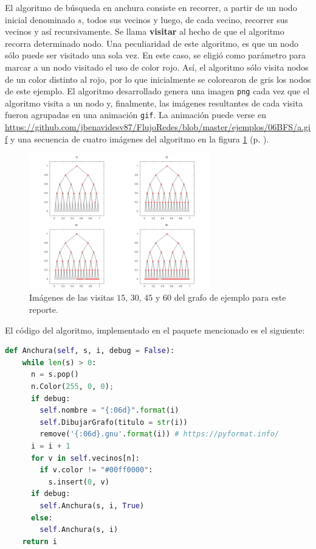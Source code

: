 \documentclass{article}
\begin{document}
  El algoritmo de búsqueda en anchura consiste en recorrer, a partir de un nodo inicial denominado $s$, todos sus vecinos y luego, de cada vecino, recorrer sus vecinos y así recursivamente. Se llama \textbf{visitar} al hecho de que el algoritmo recorra determinado nodo. Una peculiaridad de este algoritmo, es que un nodo sólo puede ser visitado una sola vez. En este caso, se eligió como parámetro para marcar a un nodo visitado el uso de color rojo. Así, el algoritmo sólo visita nodos de un color distinto al rojo, por lo que inicialmente se colorearon de gris los nodos de este ejemplo. El algoritmo desarrollado genera una imagen \texttt{png} cada vez que el algoritmo visita a un nodo y, finalmente, las imágenes resultantes de cada visita fueron agrupadas en una animación \texttt{gif}. La animación puede verse en \url{https://github.com/jbenavidesv87/FlujoRedes/blob/master/ejemplos/06BFS/a.gif} y una secuencia de cuatro imágenes del algoritmo en la figura \ref{ejemploAnchura} (p. \pageref{ejemploAnchura}).

  \begin{figure}[h]
    \includegraphics[width=0.7\textwidth]{ejemploAnchura}
    \centering
    \caption{Imágenes de las visitas $15$, $30$, $45$ y $60$ del grafo de ejemplo para este reporte.}
    \label{ejemploAnchura}
  \end{figure}

  El código del algoritmo, implementado en el paquete mencionado es el siguiente:

  \begin{lstlisting}[language=Python]
  def Anchura(self, s, i, debug = False):
    while len(s) > 0:
      n = s.pop()
      n.Color(255, 0, 0);
      if debug:
        self.nombre = "{:06d}".format(i)
        self.DibujarGrafo(titulo = str(i))
        remove('{:06d}.gnu'.format(i)) # https://pyformat.info/
      i = i + 1
      for v in self.vecinos[n]:
        if v.color != "#00ff0000":
          s.insert(0, v)
      if debug:
        self.Anchura(s, i, True)
      else:
        self.Anchura(s, i)
    return i
  \end{lstlisting}
\end{document}
